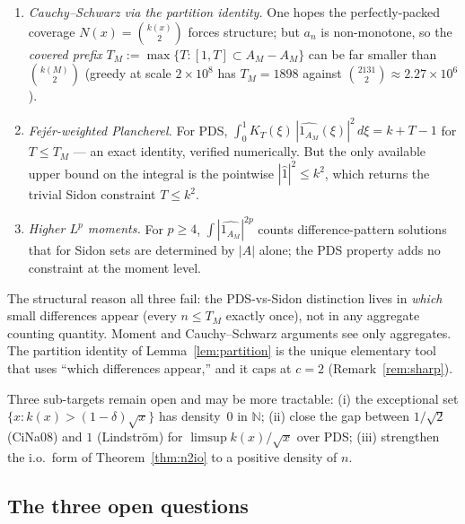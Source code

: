 \documentclass[11pt]{article}
\begin{document}
\begin{enumerate}
\item \emph{Cauchy--Schwarz via the partition identity.} One hopes the
      perfectly-packed coverage $N(x) = \binom{k(x)}{2}$ forces
      structure; but $a_n$ is non-monotone, so the \emph{covered prefix}
      $T_M := \max\{T : [1,T] \subset A_M - A_M\}$ can be far smaller
      than $\binom{k(M)}{2}$ (greedy at scale $2 \times 10^8$ has
      $T_M = 1898$ against $\binom{2131}{2} \approx 2.27 \times 10^6$).
\item \emph{Fej\'er-weighted Plancherel.} For PDS,
      $\int_0^1 K_T(\xi)\,|\widehat{1_{A_M}}(\xi)|^2\,d\xi = k + T - 1$
      for $T \leq T_M$ --- an exact identity, verified numerically. But
      the only available upper bound on the integral is the pointwise
      $|\widehat{1}|^2 \leq k^2$, which returns the trivial Sidon
      constraint $T \leq k^2$.
\item \emph{Higher $L^p$ moments.} For $p \geq 4$,
      $\int |\widehat{1_{A_M}}|^{2p}$ counts difference-pattern solutions
      that for Sidon sets are determined by $|A|$ alone; the PDS property
      adds no constraint at the moment level.
\end{enumerate}

The structural reason all three fail: the PDS-vs-Sidon distinction lives
in \emph{which} small differences appear (every $n \leq T_M$ exactly
once), not in any aggregate counting quantity. Moment and Cauchy--Schwarz
arguments see only aggregates. The partition identity of
Lemma~\ref{lem:partition} is the unique elementary tool that uses
``which differences appear,'' and it caps at $c = 2$
(Remark~\ref{rem:sharp}).

Three sub-targets remain open and may be more tractable: (i) the
exceptional set $\{x : k(x) > (1-\delta)\sqrt x\}$ has density~0 in
$\mathbb{N}$; (ii) close the gap between $1/\sqrt 2$ (CiNa08) and $1$
(Lindstr\"om) for $\limsup k(x)/\sqrt x$ over PDS; (iii) strengthen the
i.o.\ form of Theorem~\ref{thm:n2io} to a positive density of $n$.

\subsection{The three open questions}
\end{document}
